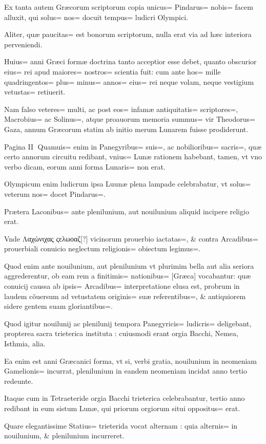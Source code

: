 \begin{parnumbers}
Ex tanta autem Græcorum scriptorum copia unicus= Pindarus= nobis= facem alluxit, qui solus= nos= docuit tempus= ludicri Olympici.

Aliter, quæ paucitas= est bonorum scriptorum, nulla erat via ad hæc interiora perveniendi.

Huius= anni Græci formæ doctrina tanto acceptior esse debet, quanto obscurior eius= rei apud maiores= nostros= scientia fuit: cum ante hos= mille quadringentos= plus= minus= annos= eius= rei neque volam, neque vestigium vetustas= retiuerit.

Nam falso veteres= multi, ac post eos= infamæ antiquitatis= scriptores=, Macrobius= ac Solinus=, atque proauorum memoria summus= vir Theodorus= Gaza, annum Græcorum statim ab initio merum Lunarem fuisse prodiderunt.

Pagina II
Quamuis= enim in Panegyribus= suis=, ac nobilioribus= sacris=, quæ certo annorum circuitu redibant, vnius= Lunæ rationem habebant, tamen, vt vno verbo dicam, eorum anni forma Lunaris= non erat.

Olympicum enim ludicrum ipsa Luunæ plena lampade celebrabatur, vt solus= veterum nos= docet Pindarus=. 

Prætera Laconibus= ante plenilunium, aut nouilunium aliquid incipere religio erat.

Vnde Λαχώνιχας ςελωοαζ[?] vicinorum prouerbio iactatas=, \& contra Arcadibus= prouerbiali conuicio neglectum religionis= obiectum legimus=. 

Quod enim ante nouilunium, aut plenilunium vt plurimim bella aut alia seriora aggrederentur, ob eam rem a finitimis= nationibus= [Græca] vocabantur: quæ conuicij caussa ab ipsis= Arcadibus= interpretatione elusa est, probrum in laudem cõuersum ad vetustatem originis= suæ referentibus=, \& antiquiorem sidere gentem suam gloriantibus=. 

Quod igitur nouilunij ac plenilunij tempora Panegyricis= ludicris= deligebant, propterea sacra trieterica instituta : cuiusmodi erant orgia Bacchi, Nemea, Isthmia, alia.

Ea enim est anni Græcanici forma, vt si, verbi gratia, nouilunium in neomeniam Gamelionis= incurrat, plenilunium in eandem neomeniam incidat anno tertio redeunte.

Itaque cum in Tetraeteride orgia Bacchi trieterica celebrabantur, tertio anno redibant in eum sistum Lunæ, qui priorum orgiorum situi oppositus= erat.

Quare elegantissime Statius= trieterida vocat alternam : quia alternis= in nouilunium, \& plenilunium incurreret.


\end{parnumbers}
